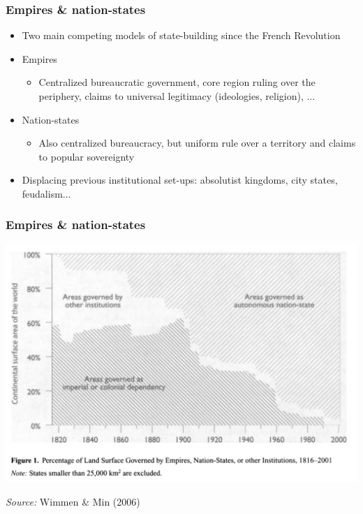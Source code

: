 \documentclass[aspectratio=43]{beamer}
\begin{document}
\begin{frame}
\frametitle{Empires \& nation-states}
\centering

\begin{itemize}[<+->]
  \item Two main competing models of state-building since the French Revolution
  \item Empires
  \begin{itemize}
    \item Centralized bureaucratic government, core region ruling over the periphery, claims to universal legitimacy (ideologies, religion), ...
  \end{itemize}
  \item Nation-states
  \begin{itemize}
    \item Also centralized bureaucracy, but uniform rule over a territory and claims to popular sovereignty
  \end{itemize}
  \item Displacing previous institutional set-ups: absolutist kingdoms, city states, feudalism...
\end{itemize}

\end{frame}

\begin{frame}
\frametitle{Empires \& nation-states}
\centering

\includegraphics[width = \textwidth]{img/wimmer_min_fig1}

{\scriptsize \textit{Source:} Wimmen \& Min (2006)}

\end{frame}
\end{document}

